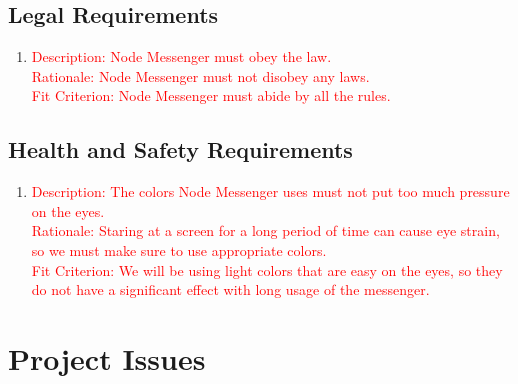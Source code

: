\documentclass[12pt, titlepage]{article}
\begin{document}
	    \subsection{Legal Requirements}
	    \begin{enumerate}
    	\item \textcolor{red}{Description: Node Messenger must obey the law. \\
    		  Rationale: Node Messenger must not disobey any laws. \\
    		  Fit Criterion: Node Messenger must abide by all the rules.}
    	\end{enumerate}
    	\subsection{Health and Safety Requirements}
    	\begin{enumerate}
    	\item \textcolor{red}{Description: The colors Node Messenger uses must not put too much pressure on the eyes. \\
    		  Rationale: Staring at a screen for a long period of time can cause eye strain, so we must make sure to use appropriate colors. \\
    		  Fit Criterion: We will be using light colors that are easy on the eyes, so they do not have a significant effect with long usage of the messenger.}
    	\end{enumerate}
	
	\newpage
	
\section{Project Issues}
\end{document}

